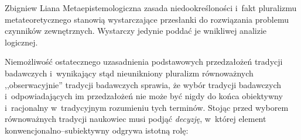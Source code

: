 \begin{artplenv}{Zbigniew Liana}
Metaepistemologiczna zasada niedookreśloności i~fakt pluralizmu metateoretycznego stanowią wystarczające przesłanki do rozwiązania problemu czynników zewnętrznych. Wystarczy jedynie poddać je wnikliwej analizie logicznej.

Niemożliwość ostatecznego uzasadnienia podstawowych przedzałożeń tradycji badawczych i~wynikający stąd nieunikniony pluralizm równoważnych ,,obserwacyjnie'' tradycji badawczych sprawia, że wybór tradycji badawczych i~odpowiadających im przedzałożeń nie może być nigdy do końca obiektywny i~racjonalny w~tradycyjnym rozumieniu tych terminów. Stojąc przed wyborem równoważnych tradycji naukowiec musi podjąć \textit{decyzję}, w~której element konwencjonalno–subiektywny odgrywa istotną rolę:



\end{artplenv}
